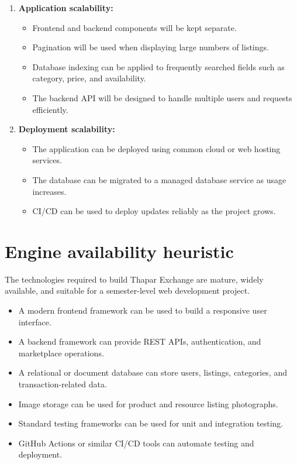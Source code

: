 \documentclass[11pt,a4paper]{article}
\begin{document}
\begin{enumerate}[leftmargin=0.7cm]
    \item \textbf{Application scalability:}
    \begin{itemize}[leftmargin=0.7cm]
        \item Frontend and backend components will be kept separate.
        \item Pagination will be used when displaying large numbers of listings.
        \item Database indexing can be applied to frequently searched fields such as category, price, and availability.
        \item The backend API will be designed to handle multiple users and requests efficiently.
    \end{itemize}

    \item \textbf{Deployment scalability:}
    \begin{itemize}[leftmargin=0.7cm]
        \item The application can be deployed using common cloud or web hosting services.
        \item The database can be migrated to a managed database service as usage increases.
        \item CI/CD can be used to deploy updates reliably as the project grows.
    \end{itemize}
\end{enumerate}

\section{Engine availability heuristic}

The technologies required to build Thapar Exchange are mature, widely available, and suitable for a semester-level web development project.

\begin{itemize}[leftmargin=0.7cm]
    \item A modern frontend framework can be used to build a responsive user interface.
    \item A backend framework can provide REST APIs, authentication, and marketplace operations.
    \item A relational or document database can store users, listings, categories, and transaction-related data.
    \item Image storage can be used for product and resource listing photographs.
    \item Standard testing frameworks can be used for unit and integration testing.
    \item GitHub Actions or similar CI/CD tools can automate testing and deployment.
\end{itemize}
\end{document}
